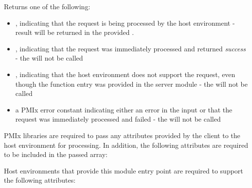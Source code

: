 \begin{arglist}
\end{arglist}

Returns one of the following:

\begin{itemize}
    \item {}, indicating that the request is being processed by the host environment - result will be returned in the provided .
    \item {}, indicating that the request was immediately processed and returned \textit{success} - the  will not be called
    \item {}, indicating that the host environment does not support the request, even though the function entry was provided in the server module - the  will not be called
    \item a PMIx error constant indicating either an error in the input or that the request was immediately processed and failed - the  will not be called
\end{itemize}

\reqattrstart
\ac{PMIx} libraries are required to pass any attributes provided by the client to the host environment for processing. In addition, the following attributes are required to be included in the passed  array:


\divider

Host environments that provide this module entry point are required to support the following attributes:


